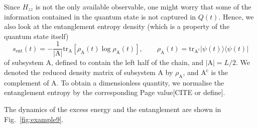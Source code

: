 \documentclass{SciPost}
\newcommand\0{\scalebox{-1}[1]{0}}
\begin{document}
Since $H_{zz}$ is not the only available observable, one might worry that some of the information contained in the quantum state is not captured in $Q(t)$. Hence, we also look at the entanglement entropy density (which is a property of the quantum state itself)
\begin{equation}
s_\mathrm{ent}(t) = -\frac{1}{|\mathrm{A}|}\mathrm{tr}_{\mathrm{A}}\left[\rho_\mathrm{A}(t)\log\rho_\mathrm{A}(t)\right], \qquad \rho_\mathrm{A}(t) = \mathrm{tr}_{\mathrm{A^c}} |\psi(t)\rangle\langle\psi(t)|
\end{equation}
of subsystem A, defined to contain the left half of the chain, and $|\mathrm{A}|=L/2$. We denoted the reduced density matrix of subsystem A by $\rho_\mathrm{A}$, and $\mathrm{A^c}$ is the complement of A. To obtain a dimensionless quantity, we normalise the entanglement entropy by the corresponding Page value[CITE or define].

The dynamics of the excess energy and the entanglement are shown in Fig.~\ref{fig:example9}. 
\end{document}
